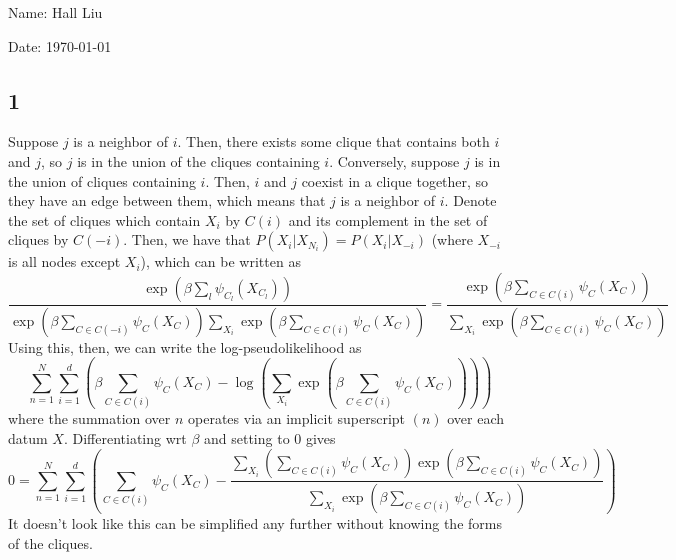 \documentclass{article}
\begin{document}
Name: Hall Liu

Date: \today 
\vspace{1.5cm}

\subsection*{1}
Suppose $j$ is a neighbor of $i$. Then, there exists some clique that contains both $i$ and $j$, so $j$ is in the union of the cliques containing $i$. Conversely, suppose $j$ is in the union of cliques containing $i$. Then, $i$ and $j$ coexist in a clique together, so they have an edge between them, which means that $j$ is a neighbor of $i$.
Denote the set of cliques which contain $X_i$ by $C(i)$ and its complement in the set of cliques by $C(-i)$. Then, we have that $P(X_i|X_{N_i})=P(X_i|X_{-i})$ (where $X_{-i}$ is all nodes except $X_i$), which can be written as 
\[\frac{\exp\left(\beta\sum_l\psi_{C_l}(X_{C_l})\right)}{\exp\left(\beta\sum_{C\in C(-i)}\psi_C(X_C)\right)\sum_{X_i}\exp\left(\beta\sum_{C\in C(i)}\psi_C(X_C)\right)}=\frac{\exp\left(\beta\sum_{C\in C(i)}\psi_{C}(X_{C})\right)}{\sum_{X_i}\exp\left(\beta\sum_{C\in C(i)}\psi_C(X_C)\right)}\]
Using this, then, we can write the log-pseudolikelihood as
\[\sum_{n=1}^N\sum_{i=1}^d\left(\beta\sum_{C\in C(i)}\psi_{C}(X_{C})-\log\left(\sum_{X_i}\exp\left(\beta\sum_{C\in C(i)}\psi_C(X_C)\right)\right)\right)\]
where the summation over $n$ operates via an implicit superscript $(n)$ over each datum $X$. Differentiating wrt $\beta$ and setting to $0$ gives 
\[0=\sum_{n=1}^N\sum_{i=1}^d\left(\sum_{C\in C(i)}\psi_{C}(X_{C})-\frac{\sum_{X_i}\left(\sum_{C\in C(i)}\psi_C(X_C)\right)\exp\left(\beta\sum_{C\in C(i)}\psi_C(X_C)\right)}{\sum_{X_i}\exp\left(\beta\sum_{C\in C(i)}\psi_C(X_C)\right)}\right)\]
It doesn't look like this can be simplified any further without knowing the forms of the cliques.
\end{document}
